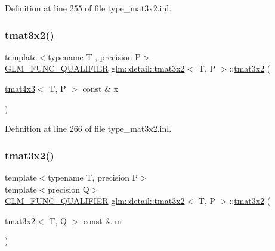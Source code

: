 Definition at line 255 of file type\+\_\+mat3x2.\+inl.

\mbox{\label{structglm_1_1detail_1_1tmat3x2_a2e2513abd10a92e41c9b87e858fb4e1f}} 
\subsubsection{\texorpdfstring{tmat3x2()}{tmat3x2()}\hspace{0.1cm}{\footnotesize\ttfamily [18/22]}}
{\footnotesize\ttfamily template$<$typename T , precision P$>$ \\
\hyperlink{setup_8hpp_a33fdea6f91c5f834105f7415e2a64407}{G\+L\+M\+\_\+\+F\+U\+N\+C\+\_\+\+Q\+U\+A\+L\+I\+F\+I\+ER} \hyperlink{structglm_1_1detail_1_1tmat3x2}{glm\+::detail\+::tmat3x2}$<$ T, P $>$\+::\hyperlink{structglm_1_1detail_1_1tmat3x2}{tmat3x2} (\begin{DoxyParamCaption}\item[{\hyperlink{structglm_1_1detail_1_1tmat4x3}{tmat4x3}$<$ T, P $>$ const \&}]{x }\end{DoxyParamCaption})\hspace{0.3cm}{\ttfamily [explicit]}}



Definition at line 266 of file type\+\_\+mat3x2.\+inl.

\mbox{\label{structglm_1_1detail_1_1tmat3x2_a5b0141e3e353259aed227c013a5ae5a0}} 
\subsubsection{\texorpdfstring{tmat3x2()}{tmat3x2()}\hspace{0.1cm}{\footnotesize\ttfamily [19/22]}}
{\footnotesize\ttfamily template$<$typename T, precision P$>$ \\
template$<$precision Q$>$ \\
\hyperlink{setup_8hpp_a33fdea6f91c5f834105f7415e2a64407}{G\+L\+M\+\_\+\+F\+U\+N\+C\+\_\+\+Q\+U\+A\+L\+I\+F\+I\+ER} \hyperlink{structglm_1_1detail_1_1tmat3x2}{glm\+::detail\+::tmat3x2}$<$ T, P $>$\+::\hyperlink{structglm_1_1detail_1_1tmat3x2}{tmat3x2} (\begin{DoxyParamCaption}\item[{\hyperlink{structglm_1_1detail_1_1tmat3x2}{tmat3x2}$<$ T, Q $>$ const \&}]{m }\end{DoxyParamCaption})}



